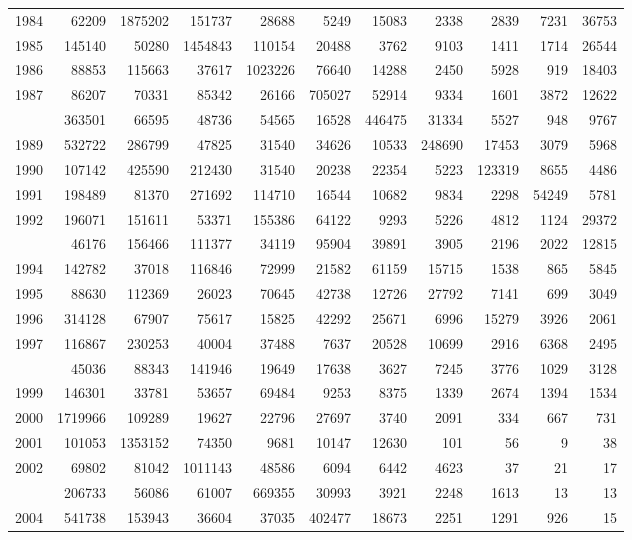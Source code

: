 \documentclass[
]{article}
\begin{document}
\begin{longtable}[t]{lrrrrrrrrrr}
1984 & 62209 & 1875202 & 151737 & 28688 & 5249 & 15083 & 2338 & 2839 & 7231 & 36753\\
1985 & 145140 & 50280 & 1454843 & 110154 & 20488 & 3762 & 9103 & 1411 & 1714 & 26544\\
1986 & 88853 & 115663 & 37617 & 1023226 & 76640 & 14288 & 2450 & 5928 & 919 & 18403\\
1987 & 86207 & 70331 & 85342 & 26166 & 705027 & 52914 & 9334 & 1601 & 3872 & 12622\\
\addlinespace
1988 & 363501 & 66595 & 48736 & 54565 & 16528 & 446475 & 31334 & 5527 & 948 & 9767\\
1989 & 532722 & 286799 & 47825 & 31540 & 34626 & 10533 & 248690 & 17453 & 3079 & 5968\\
1990 & 107142 & 425590 & 212430 & 31540 & 20238 & 22354 & 5223 & 123319 & 8655 & 4486\\
1991 & 198489 & 81370 & 271692 & 114710 & 16544 & 10682 & 9834 & 2298 & 54249 & 5781\\
1992 & 196071 & 151611 & 53371 & 155386 & 64122 & 9293 & 5226 & 4812 & 1124 & 29372\\
\addlinespace
1993 & 46176 & 156466 & 111377 & 34119 & 95904 & 39891 & 3905 & 2196 & 2022 & 12815\\
1994 & 142782 & 37018 & 116846 & 72999 & 21582 & 61159 & 15715 & 1538 & 865 & 5845\\
1995 & 88630 & 112369 & 26023 & 70645 & 42738 & 12726 & 27792 & 7141 & 699 & 3049\\
1996 & 314128 & 67907 & 75617 & 15825 & 42292 & 25671 & 6996 & 15279 & 3926 & 2061\\
1997 & 116867 & 230253 & 40004 & 37488 & 7637 & 20528 & 10699 & 2916 & 6368 & 2495\\
\addlinespace
1998 & 45036 & 88343 & 141946 & 19649 & 17638 & 3627 & 7245 & 3776 & 1029 & 3128\\
1999 & 146301 & 33781 & 53657 & 69484 & 9253 & 8375 & 1339 & 2674 & 1394 & 1534\\
2000 & 1719966 & 109289 & 19627 & 22796 & 27697 & 3740 & 2091 & 334 & 667 & 731\\
2001 & 101053 & 1353152 & 74350 & 9681 & 10147 & 12630 & 101 & 56 & 9 & 38\\
2002 & 69802 & 81042 & 1011143 & 48586 & 6094 & 6442 & 4623 & 37 & 21 & 17\\
\addlinespace
2003 & 206733 & 56086 & 61007 & 669355 & 30993 & 3921 & 2248 & 1613 & 13 & 13\\
2004 & 541738 & 153943 & 36604 & 37035 & 402477 & 18673 & 2251 & 1291 & 926 & 15\\

\end{longtable}
\end{document}
